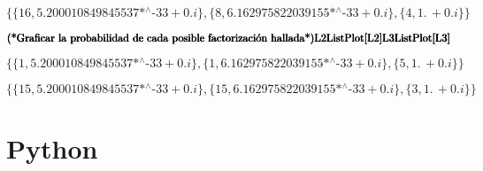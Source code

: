\begin{doublespace}
\noindent\(\{\{16,\text{5.200010849845537$\grave{ }$*${}^{\wedge}$-33}+0. i\},\{8,\text{6.162975822039155$\grave{ }$*${}^{\wedge}$-33}+0. i\},\{4,1.\,
+0. i\}\}\)
\end{doublespace}

\begin{doublespace}
\noindent\(\pmb{\text{(*Graficar la probabilidad de cada posible factorizaci{\' o}n hallada*)}}\\
\pmb{\text{L2}}\\
\pmb{\text{ListPlot}[\text{L2}]}\\
\pmb{\text{L3}}\\
\pmb{\text{ListPlot}[\text{L3}]}\)
\end{doublespace}

\begin{doublespace}
\noindent\(\{\{1,\text{5.200010849845537$\grave{ }$*${}^{\wedge}$-33}+0. i\},\{1,\text{6.162975822039155$\grave{ }$*${}^{\wedge}$-33}+0. i\},\{5,1.\,
+0. i\}\}\)
\end{doublespace}

\begin{doublespace}
\noindent\(\{\{15,\text{5.200010849845537$\grave{ }$*${}^{\wedge}$-33}+0. i\},\{15,\text{6.162975822039155$\grave{ }$*${}^{\wedge}$-33}+0. i\},\{3,1.\,
+0. i\}\}\)
\end{doublespace}

\section{Python}

